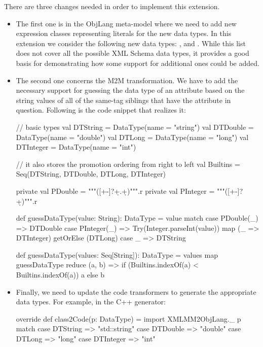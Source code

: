 There are three changes needed in order to implement this extension.
\begin{itemize}[(1)]
	\item The first one is in the ObjLang meta-model where we need to add new expression classes representing literals for the new data types.
	In this extension we consider the following new data types: ,  and .
	While this list does not cover all the possible XML Schema data types, it provides a good basis for demonstrating how some support for additional ones could be added.

	\item The second one concerns the M2M transformation.
	We have to add the necessary support for guessing the data type of an attribute based on the string values of all of the same-tag siblings that have the attribute in question.
	Following is the code snippet that realizes it:
	\begin{scalacode}
	  // basic types
	  val DTString = DataType(name = "string")
	  val DTDouble = DataType(name = "double")
	  val DTLong = DataType(name = "long")
	  val DTInteger = DataType(name = "int")

	  // it also stores the promotion ordering from right to left
	  val Builtins = Seq(DTString, DTDouble, DTLong, DTInteger)

	  private val PDouble = """([+-]?\d+.\d+)""".r
	  private val PInteger = """([+-]?\d+)""".r

	  def guessDataType(value: String): DataType = value match {
	    case PDouble(_) => DTDouble
	    case PInteger(_) => Try(Integer.parseInt(value)) map (_ => DTInteger) getOrElse (DTLong)
	    case _ => DTString
	  }

	  def guessDataType(values: Seq[String]): DataType =
	    values map guessDataType reduce { (a, b) =>
	      if (Builtins.indexOf(a) < Builtins.indexOf(a)) a else b
	    }
	\end{scalacode}

	\item Finally, we need to update the code transformers to generate the appropriate data types.
	For example, in the C++ generator:
	\begin{scalacode}
override def class2Code(p: DataType) = {
  import XMLMM2ObjLang._
  p match {
    case DTString => "std::string"
    case DTDouble => "double"
    case DTLong => "long"
    case DTInteger => "int"
  }
}		
	\end{scalacode}
\end{itemize}

